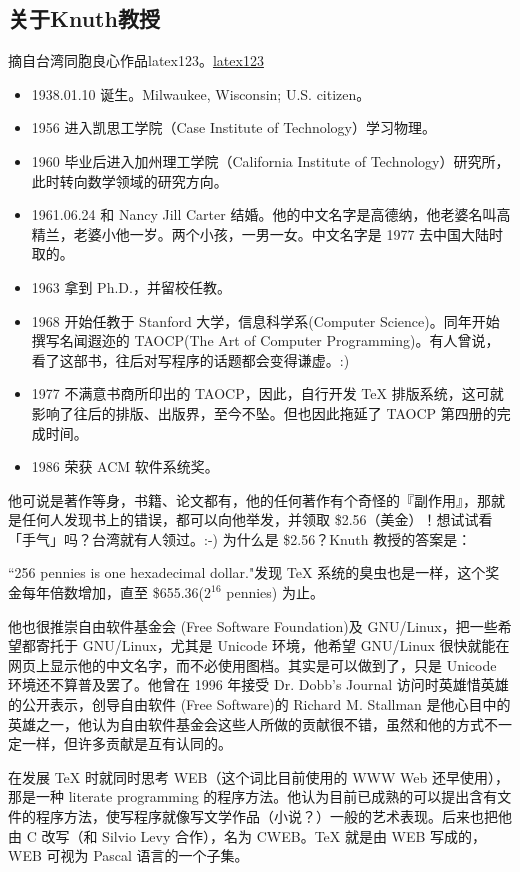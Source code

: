 \documentclass[12pt,oneside]{book}
\begin{document}
\begin{common-format}
\subsection{关于Knuth教授}
摘自台湾同胞良心作品latex123。\href{http://cle.linux.org.tw/~edt1023/tex/latex123/node2.html}{latex123}
\begin{itemize}
\item 1938.01.10	诞生。Milwaukee, Wisconsin; U.S. citizen。
\item 1956	进入凯思工学院（Case Institute of Technology）学习物理。
\item 1960	毕业后进入加州理工学院（California Institute of Technology）研究所，此时转向数学领域的研究方向。
\item 1961.06.24	和 Nancy Jill Carter 结婚。他的中文名字是高德纳，他老婆名叫高精兰，老婆小他一岁。两个小孩，一男一女。中文名字是 1977 去中国大陆时取的。
\item 1963	拿到 Ph.D.，并留校任教。
\item 1968	开始任教于 Stanford 大学，信息科学系(Computer Science)。同年开始撰写名闻遐迩的 TAOCP(The Art of Computer Programming)。有人曾说，看了这部书，往后对写程序的话题都会变得谦虚。:)
\item 1977	不满意书商所印出的 TAOCP，因此，自行开发 TeX 排版系统，这可就影响了往后的排版、出版界，至今不坠。但也因此拖延了 TAOCP 第四册的完成时间。
\item 1986	荣获 ACM 软件系统奖。
\end{itemize}

他可说是著作等身，书籍、论文都有，他的任何著作有个奇怪的『副作用』，那就是任何人发现书上的错误，都可以向他举发，并领取 \$2.56（美金）！想试试看「手气」吗？台湾就有人领过。:-) 为什么是 \$2.56？Knuth 教授的答案是：

``256 pennies is one hexadecimal dollar."发现 TeX 系统的臭虫也是一样，这个奖金每年倍数增加，直至 \$655.36($ 2^{16}$ pennies) 为止。

他也很推崇自由软件基金会 (Free Software Foundation)及 GNU/Linux，把一些希望都寄托于 GNU/Linux，尤其是 Unicode 环境，他希望 GNU/Linux 很快就能在网页上显示他的中文名字，而不必使用图档。其实是可以做到了，只是 Unicode 环境还不算普及罢了。他曾在 1996 年接受 Dr. Dobb's Journal 访问时英雄惜英雄的公开表示，创导自由软件 (Free Software)的 Richard M. Stallman 是他心目中的英雄之一，他认为自由软件基金会这些人所做的贡献很不错，虽然和他的方式不一定一样，但许多贡献是互有认同的。

在发展 TeX 时就同时思考 WEB（这个词比目前使用的 WWW Web 还早使用），那是一种 literate programming 的程序方法。他认为目前已成熟的可以提出含有文件的程序方法，使写程序就像写文学作品（小说？）一般的艺术表现。后来也把他由 C 改写（和 Silvio Levy 合作），名为 CWEB。TeX 就是由 WEB 写成的，WEB 可视为 Pascal 语言的一个子集。


\end{common-format}
\end{document}
